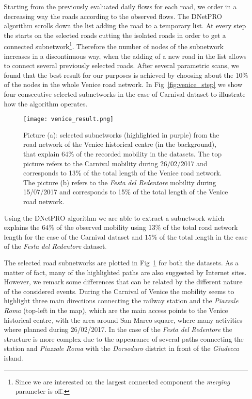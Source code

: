 \documentclass{standalone}
\begin{document}
Starting from the previously evaluated daily flows for each road, we order in a decreasing way the roads according to the observed
flows.
The \textsf{DNetPRO} algorithm scrolls down the list adding the road to a temporary list.
At every step the  starts on the selected roads cutting the isolated roads in order to get a connected subnetwork\footnote{
  Since we are interested on the largest connected component the \emph{merging} parameter is off.
}.
Therefore the number of nodes of the subnetwork increases in a discontinuous way, when the adding of a new road in the list allows to
connect several previously selected roads.
After several parametric scans, we found that the best result for our purposes is achieved by choosing about the 10\% of the nodes in the whole Venice road network.
In Fig~\ref{fig:venice_step} we show four consecutive selected subnetworks in the case of Carnival dataset to illustrate how the algorithm operates.

\begin{center}
\begin{figure}[htbp]
\centering
\texttt{[image: venice\_result.png]}
\caption{Picture (a): selected subnetworks (highlighted in purple) from the road network of the Venice historical centre (in the background), that explain 64\% of the recorded mobility in the datasets.
The top picture refers to the Carnival mobility during 26/02/2017 and corresponds to 13\% of the total length of the Venice road network.
The picture (b) refers to the \emph{Festa del Redentore} mobility during 15/07/2017 and corresponds to 15\% of the total length of the Venice road network.
}
\label{fig:venice_result}
\end{figure}
\end{center}

Using the \textsf{DNetPRO} algorithm we are able to extract a subnetwork which explains the 64\% of the observed mobility using 13\% of the total road network length for the case of the Carnival dataset and 15\% of the total length in the case of the \emph{Festa del Redentore} dataset.

The selected road subnetworks are plotted in Fig~\ref{fig:venice_result} for both the datasets.
As a matter of fact, many of the highlighted paths are also suggested by Internet sites.
However, we remark some differences that can be related by the different nature of the considered events.
During the Carnival of Venice the mobility seems to highlight three main directions connecting the railway station and the \emph{Piazzale Roma} (top-left in the map), which are the main access points to the Venice historical centre, with the area around San Marco square, where many activities where planned during 26/02/2017.
In the case of the \emph{Festa del Redentore} the structure is more complex due to the appearance of several paths connecting the station and \emph{Piazzale Roma} with the \emph{Dorsoduro} district in front of the \emph{Giudecca} island.
\end{document}
